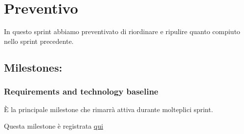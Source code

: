 \section{Preventivo}

In questo sprint abbiamo preventivato di riordinare e ripulire quanto compiuto nello sprint precedente.

\subsection{Milestones:}  
\subsubsection{Requirements and technology baseline}

È la principale milestone che rimarrà attiva durante molteplici sprint.

Questa milestone è registrata \href{https://github.com/SWEasabi/documentazione/milestone/2}{qui}
